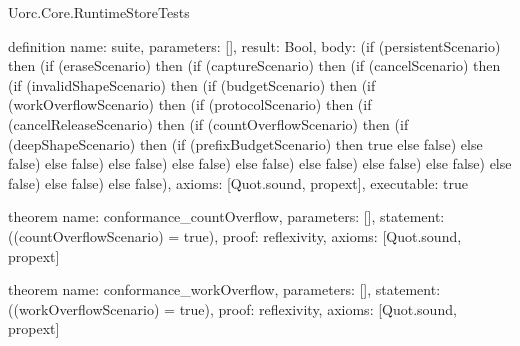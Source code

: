 \begin{lexlean}{Uorc.Core.RuntimeStoreTests}
\begin{semanticmodule}
definition{
  name: suite,
  parameters: [],
  result: Bool,
  body: (if (persistentScenario) then (if (eraseScenario) then (if (captureScenario) then (if (cancelScenario) then (if (invalidShapeScenario) then (if (budgetScenario) then (if (workOverflowScenario) then (if (protocolScenario) then (if (cancelReleaseScenario) then (if (countOverflowScenario) then (if (deepShapeScenario) then (if (prefixBudgetScenario) then true else false) else false) else false) else false) else false) else false) else false) else false) else false) else false) else false) else false),
  axioms: [Quot.sound, propext],
  executable: true
}

theorem{
  name: conformance_countOverflow,
  parameters: [],
  statement: ((countOverflowScenario) = true),
  proof: reflexivity{},
  axioms: [Quot.sound, propext]
}

theorem{
  name: conformance_workOverflow,
  parameters: [],
  statement: ((workOverflowScenario) = true),
  proof: reflexivity{},
  axioms: [Quot.sound, propext]
}
\end{semanticmodule}

\end{lexlean}
